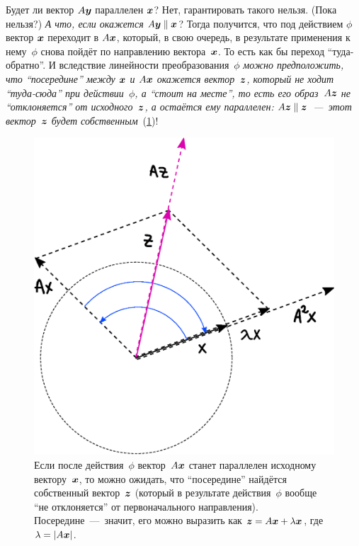 \documentclass[a4paper,12pt]{article}
\theoremstyle{remark}
\begin{document}
  Будет ли вектор $A \boldsymbol y$ параллелен $\boldsymbol x$?
  Нет, гарантировать такого нельзя.
  (Пока нельзя?)
  \emph{А что, если окажется $A \bds y \hm\parallel \bds x$}?
  Тогда получится, что под действием $\phi$ вектор $\boldsymbol x$ переходит в $A \boldsymbol x$, который, в свою очередь, в результате применения к нему~$\phi$ снова пойдёт по направлению вектора~$\boldsymbol x$.
  То есть как бы переход ``туда-обратно''.
  И вследствие линейности преобразования~$\phi$ \emph{можно предположить, что ``посередине'' между $\boldsymbol x$ и $A \boldsymbol x$ окажется вектор~$\boldsymbol z$, который не ходит ``туда-сюда'' при действии~$\phi$, а ``стоит на месте'', то есть его образ~$A \boldsymbol z$ не ``отклоняется'' от исходного~$\boldsymbol z$, а остаётся ему параллелен: $A \bds z \hm\parallel \bds z$~---~этот вектор~$\boldsymbol z$ будет собственным}~(\ref{fig:self-adjo-eigen-here-you-are})!
  
  \begin{figure}
    \centering
    
    \includegraphics[width=0.56\columnwidth]{self-adjo-eigen-here-you-are}
    
    \caption{Если после действия~$\phi$ вектор~$A \boldsymbol x$ станет параллелен исходному вектору~$\boldsymbol x$, то можно ожидать, что ``посередине'' найдётся собственный вектор~$\boldsymbol z$ (который в результате действия~$\phi$ вообще ``не отклоняется'' от первоначального направления). Посередине~---~значит, его можно выразить как $\bds z \hm= A \bds x \hm+ \lambda \bds x$, где $\lambda \hm= |A \bds x|$.}
    \label{fig:self-adjo-eigen-here-you-are}
  \end{figure}
  
\end{document}
